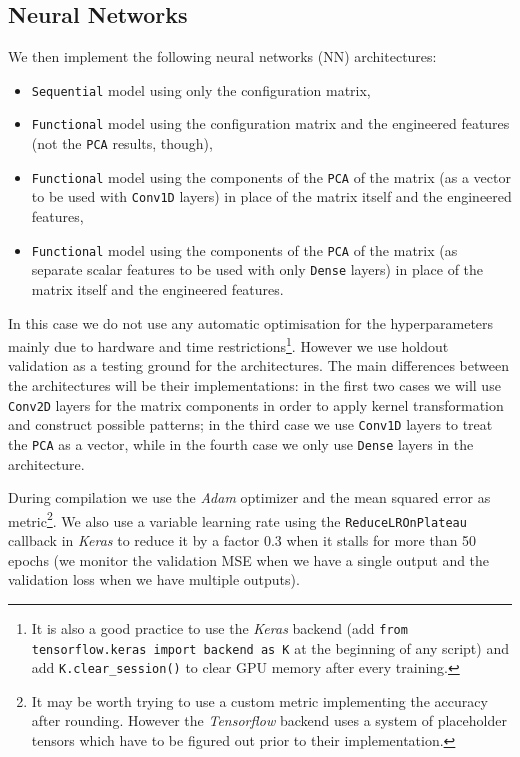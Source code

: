 \subsection{Neural Networks}
    We then implement the following neural networks (NN) architectures:
    \begin{itemize}
        \item \texttt{Sequential} model using only the configuration matrix,
        \item \texttt{Functional} model using the configuration matrix and the engineered features (not the \texttt{PCA} results, though),
        \item \texttt{Functional} model using the components of the \texttt{PCA} of the matrix (as a vector to be used with \texttt{Conv1D} layers) in place of the matrix itself and the engineered features,
        \item \texttt{Functional} model using the components of the \texttt{PCA} of the matrix (as separate scalar features to be used with only \texttt{Dense} layers) in place of the matrix itself and the engineered features.
    \end{itemize}
    In this case we do not use any automatic optimisation for the hyperparameters mainly due to hardware and time restrictions\footnote{It is also a good practice to use the \textit{Keras} backend (add \texttt{from tensorflow.keras import backend as K} at the beginning of any script) and add \texttt{K.clear\_session()} to clear GPU memory after every training.}. However we use holdout validation as a testing ground for the architectures. The main differences between the architectures will be their implementations: in the first two cases we will use \texttt{Conv2D} layers for the matrix components in order to apply kernel transformation and construct possible patterns; in the third case we use \texttt{Conv1D} layers to treat the \texttt{PCA} as a vector, while in the fourth case we only use \texttt{Dense} layers in the architecture.
    
    During compilation we use the \textit{Adam} optimizer and the mean squared error as metric\footnote{It may be worth trying to use a custom metric implementing the accuracy after rounding. However the \textit{Tensorflow} backend uses a system of placeholder tensors which have to be figured out prior to their implementation.}. We also use a variable learning rate using the \texttt{ReduceLROnPlateau} callback in \textit{Keras} to reduce it by a factor 0.3 when it stalls for more than 50 epochs (we monitor the validation MSE when we have a single output and the validation loss when we have multiple outputs).
    
